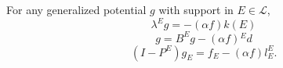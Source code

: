 For any generalized potential $g$ with support in $E \in \mathcal{L}$,
$$\lambda^E g = -(\alpha f)k(E)$$
$$g = B^E g - (\alpha f){}^E d$$
$$(I - P^E)g_E = f_E - (\alpha f)l_E^E.$$
